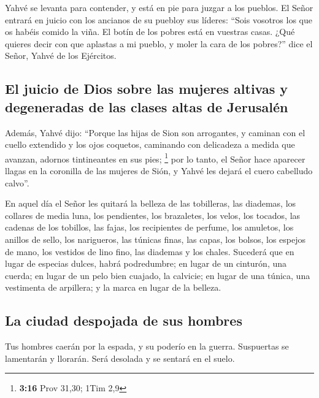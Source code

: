  Yahvé se levanta para contender, y está en pie para
juzgar a los pueblos.  El Señor entrará en juicio con los
ancianos de su puebloy sus líderes: ``Sois vosotros los que os habéis
comido la viña. El botín de los pobres está en vuestras casas.
 ¿Qué quieres decir con que aplastas a mi pueblo, y moler
la cara de los pobres?'' dice el Señor, Yahvé de los Ejércitos.

\hypertarget{el-juicio-de-dios-sobre-las-mujeres-altivas-y-degeneradas-de-las-clases-altas-de-jerusaluxe9n}{%
\subsection{El juicio de Dios sobre las mujeres altivas y degeneradas de
las clases altas de
Jerusalén}\label{el-juicio-de-dios-sobre-las-mujeres-altivas-y-degeneradas-de-las-clases-altas-de-jerusaluxe9n}}

 Además, Yahvé dijo: ``Porque las hijas de Sion son
arrogantes, y caminan con el cuello extendido y los ojos coquetos,
caminando con delicadeza a medida que avanzan, adornos tintineantes en
sus pies; \footnote{\textbf{3:16} Prov 31,30; 1Tim 2,9} 
por lo tanto, el Señor hace aparecer llagas en la coronilla de las
mujeres de Sión, y Yahvé les dejará el cuero cabelludo calvo''.

 En aquel día el Señor les quitará la belleza de las
tobilleras, las diademas, los collares de media luna, 
los pendientes, los brazaletes, los velos,  los tocados,
las cadenas de los tobillos, las fajas, los recipientes de perfume, los
amuletos,  los anillos de sello, los narigueros,
 las túnicas finas, las capas, los bolsos,
 los espejos de mano, los vestidos de lino fino, las
diademas y los chales.  Sucederá que en lugar de especias
dulces, habrá podredumbre; en lugar de un cinturón, una cuerda; en lugar
de un pelo bien cuajado, la calvicie; en lugar de una túnica, una
vestimenta de arpillera; y la marca en lugar de la belleza.

\hypertarget{la-ciudad-despojada-de-sus-hombres}{%
\subsection{La ciudad despojada de sus
hombres}\label{la-ciudad-despojada-de-sus-hombres}}

 Tus hombres caerán por la espada, y su poderío en la
guerra.  Suspuertas se lamentarán y llorarán. Será
desolada y se sentará en el suelo.

